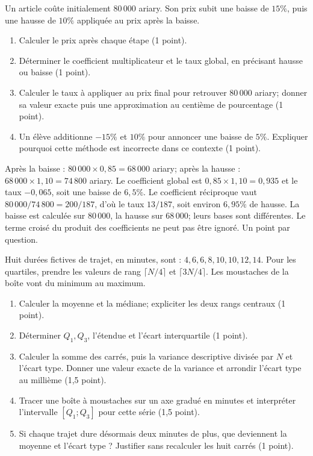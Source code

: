 \label{t11s-ds4-e01}\par
Un article coûte initialement $80\,000$ ariary. Son prix subit une baisse de $15\%$, puis une hausse de $10\%$ appliquée au prix après la baisse.
\begin{enumerate}
\item Calculer le prix après chaque étape (1 point).
\item Déterminer le coefficient multiplicateur et le taux global, en précisant hausse ou baisse (1 point).
\item Calculer le taux à appliquer au prix final pour retrouver $80\,000$ ariary; donner sa valeur exacte puis une approximation au centième de pourcentage (1 point).
\item Un élève additionne $-15\%$ et $10\%$ pour annoncer une baisse de $5\%$. Expliquer pourquoi cette méthode est incorrecte dans ce contexte (1 point).
\end{enumerate}
\begin{corrige}\label{sol-t11s-ds4-e01}
Après la baisse : $80\,000\times0{,}85=68\,000$ ariary; après la hausse : $68\,000\times1{,}10=74\,800$ ariary. Le coefficient global est $0{,}85\times1{,}10=0{,}935$ et le taux $-0{,}065$, soit une baisse de $6{,}5\%$. Le coefficient réciproque vaut $80\,000/74\,800=200/187$, d’où le taux $13/187$, soit environ $6{,}95\%$ de hausse. La baisse est calculée sur $80\,000$, la hausse sur $68\,000$; leurs bases sont différentes. Le terme croisé du produit des coefficients ne peut pas être ignoré. Un point par question.
\end{corrige}
\label{t11s-ds4-e02}\par
Huit durées fictives de trajet, en minutes, sont : $4,6,6,8,10,10,12,14$.
Pour les quartiles, prendre les valeurs de rang $\lceil N/4\rceil$ et $\lceil3N/4\rceil$. Les moustaches de la boîte vont du minimum au maximum.
\begin{enumerate}
\item Calculer la moyenne et la médiane; expliciter les deux rangs centraux (1 point).
\item Déterminer $Q_1,Q_3$, l’étendue et l’écart interquartile (1 point).
\item Calculer la somme des carrés, puis la variance descriptive divisée par $N$ et l’écart type. Donner une valeur exacte de la variance et arrondir l’écart type au millième (1,5 point).
\item Tracer une boîte à moustaches sur un axe gradué en minutes et interpréter l’intervalle $[Q_1;Q_3]$ pour cette série (1,5 point).
\item Si chaque trajet dure désormais deux minutes de plus, que deviennent la moyenne et l’écart type ? Justifier sans recalculer les huit carrés (1 point).
\end{enumerate}
